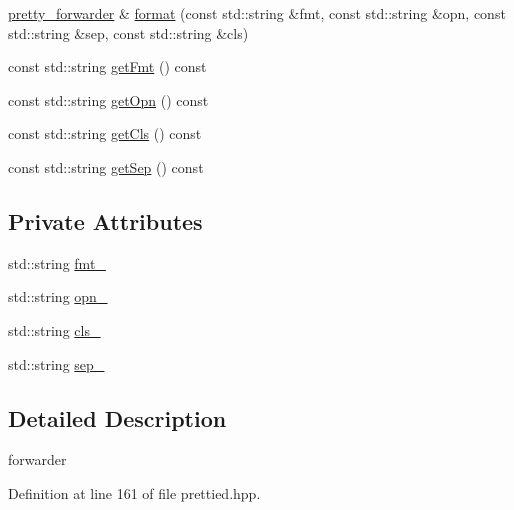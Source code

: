 \begin{DoxyCompactItemize}
$$\item 
\hyperlink{structyuh_1_1range__detail_1_1pretty__forwarder}{pretty\-\_\-forwarder} \& \hyperlink{structyuh_1_1range__detail_1_1pretty__forwarder_a398db52f75d8d8cc3544104bcbe7cb09}{format} (const std\-::string \&fmt, const std\-::string \&opn, const std\-::string \&sep, const std\-::string \&cls)
\item 
const std\-::string \hyperlink{structyuh_1_1range__detail_1_1pretty__forwarder_ad48d1ff9288be959635cf977cbb7b67b}{get\-Fmt} () const 
\item 
const std\-::string \hyperlink{structyuh_1_1range__detail_1_1pretty__forwarder_a02d0772d849c82dc4f4f840cc2bc814d}{get\-Opn} () const 
\item 
const std\-::string \hyperlink{structyuh_1_1range__detail_1_1pretty__forwarder_afa7994545109f23a395667f86886435f}{get\-Cls} () const 
\item 
const std\-::string \hyperlink{structyuh_1_1range__detail_1_1pretty__forwarder_a876faa4d7904ee6012c40e387175f9ac}{get\-Sep} () const 
\end{DoxyCompactItemize}
\subsection*{\-Private \-Attributes}
\begin{DoxyCompactItemize}
\item 
std\-::string \hyperlink{structyuh_1_1range__detail_1_1pretty__forwarder_a5c63eb77f1b985d706bcb6dd96d0b0c4}{fmt\-\_\-}
\item 
std\-::string \hyperlink{structyuh_1_1range__detail_1_1pretty__forwarder_a551279ac03e367c8394c7e2b2c78aa3e}{opn\-\_\-}
\item 
std\-::string \hyperlink{structyuh_1_1range__detail_1_1pretty__forwarder_ac1750e01b56a52147effe52c4e83e247}{cls\-\_\-}
\item 
std\-::string \hyperlink{structyuh_1_1range__detail_1_1pretty__forwarder_ae5b41e2a505b540f0b9a6e995030bcba}{sep\-\_\-}
\end{DoxyCompactItemize}


\subsection{\-Detailed \-Description}
forwarder 

\-Definition at line 161 of file prettied.\-hpp.




